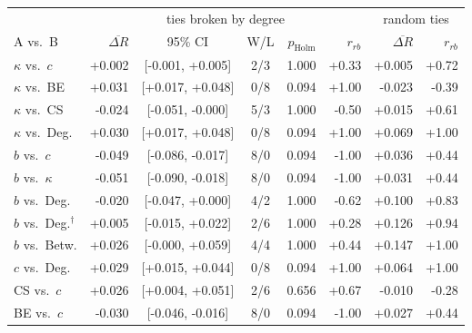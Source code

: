 \setlength{\tabcolsep}{2.5pt}\footnotesize
\begin{tabular}{l r c c r r | r r}
\toprule
 & \multicolumn{5}{c|}{ties broken by degree} & \multicolumn{2}{c}{random ties}\\
A vs.\ B & $\overline{\Delta R}$ & 95\% CI & W/L & $p_{\text{Holm}}$ & $r_{rb}$ & $\overline{\Delta R}$ & $r_{rb}$\\
\midrule
$\kappa$ vs.\ $c$ & +0.002 & [-0.001, +0.005] & 2/3 & 1.000 & +0.33 & +0.005 & +0.72\\
$\kappa$ vs.\ BE & +0.031 & [+0.017, +0.048] & 0/8 & 0.094 & +1.00 & -0.023 & -0.39\\
$\kappa$ vs.\ CS & -0.024 & [-0.051, -0.000] & 5/3 & 1.000 & -0.50 & +0.015 & +0.61\\
$\kappa$ vs.\ Deg. & +0.030 & [+0.017, +0.048] & 0/8 & 0.094 & +1.00 & +0.069 & +1.00\\
$b$ vs.\ $c$ & -0.049 & [-0.086, -0.017] & 8/0 & 0.094 & -1.00 & +0.036 & +0.44\\
$b$ vs.\ $\kappa$ & -0.051 & [-0.090, -0.018] & 8/0 & 0.094 & -1.00 & +0.031 & +0.44\\
$b$ vs.\ Deg. & -0.020 & [-0.047, +0.000] & 4/2 & 1.000 & -0.62 & +0.100 & +0.83\\
$b$ vs.\ Deg.$^\dagger$ & +0.005 & [-0.015, +0.022] & 2/6 & 1.000 & +0.28 & +0.126 & +0.94\\
$b$ vs.\ Betw. & +0.026 & [-0.000, +0.059] & 4/4 & 1.000 & +0.44 & +0.147 & +1.00\\
$c$ vs.\ Deg. & +0.029 & [+0.015, +0.044] & 0/8 & 0.094 & +1.00 & +0.064 & +1.00\\
CS vs.\ $c$ & +0.026 & [+0.004, +0.051] & 2/6 & 0.656 & +0.67 & -0.010 & -0.28\\
BE vs.\ $c$ & -0.030 & [-0.046, -0.016] & 8/0 & 0.094 & -1.00 & +0.027 & +0.44\\
\bottomrule
\end{tabular}